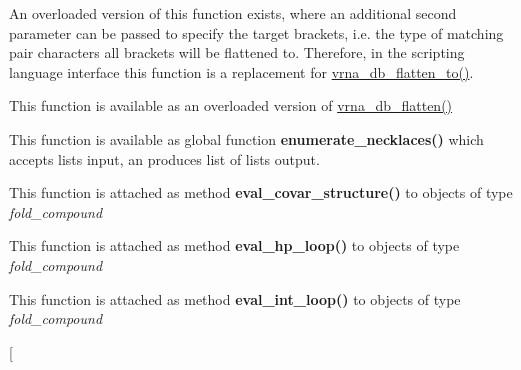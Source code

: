\begin{DoxyRefList}
An overloaded version of this function exists, where an additional second parameter can be passed to specify the target brackets, i.\+e. the type of matching pair characters all brackets will be flattened to. Therefore, in the scripting language interface this function is a replacement for \hyperlink{group__struct__utils_ga690425199c8b71545e7196e3af1436f8}{vrna\+\_\+db\+\_\+flatten\+\_\+to()}.  
\item[\label{wrappers__wrappers000060}%
\Hypertarget{wrappers__wrappers000060}%
Global \hyperlink{group__struct__utils_ga690425199c8b71545e7196e3af1436f8}{vrna\+\_\+db\+\_\+flatten\+\_\+to} (char $\ast$string, const char target\mbox{[}3\mbox{]}, unsigned int options)]This function is available as an overloaded version of \hyperlink{group__struct__utils_gae966b9f44168a4f4b39ca42ffb5f37b7}{vrna\+\_\+db\+\_\+flatten()}  
\item[\label{wrappers__wrappers000003}%
\Hypertarget{wrappers__wrappers000003}%
Global \hyperlink{group__utils_gae081ac655a76bd5c4b3d86c60b096b75}{vrna\+\_\+enumerate\+\_\+necklaces} (const unsigned int $\ast$type\+\_\+counts)]This function is available as global function {\bfseries enumerate\+\_\+necklaces()} which accepts lists input, an produces list of lists output.  
\item[\label{wrappers__wrappers000029}%
\Hypertarget{wrappers__wrappers000029}%
Global \hyperlink{group__eval_ga6cea75c0eb9857fb59172be54cab09e0}{vrna\+\_\+eval\+\_\+covar\+\_\+structure} (vrna\+\_\+fold\+\_\+compound\+\_\+t $\ast$vc, const char $\ast$structure)]This function is attached as method {\bfseries eval\+\_\+covar\+\_\+structure()} to objects of type {\itshape fold\+\_\+compound}  
\item[\label{wrappers__wrappers000033}%
\Hypertarget{wrappers__wrappers000033}%
Global \hyperlink{group__loops_gab3eb4651dc26dc2b653a57dd340d7e68}{vrna\+\_\+eval\+\_\+hp\+\_\+loop} (vrna\+\_\+fold\+\_\+compound\+\_\+t $\ast$vc, int i, int j)]This function is attached as method {\bfseries eval\+\_\+hp\+\_\+loop()} to objects of type {\itshape fold\+\_\+compound}  
\item[\label{wrappers__wrappers000034}%
\Hypertarget{wrappers__wrappers000034}%
Global \hyperlink{group__loops_ga018f1314dbbae42fdd27c94670b61721}{vrna\+\_\+eval\+\_\+int\+\_\+loop} (vrna\+\_\+fold\+\_\+compound\+\_\+t $\ast$vc, int i, int j, int k, int l)]This function is attached as method {\bfseries eval\+\_\+int\+\_\+loop()} to objects of type {\itshape fold\+\_\+compound}  
\item[\label{wrappers__wrappers000030}%

\end{DoxyRefList}
